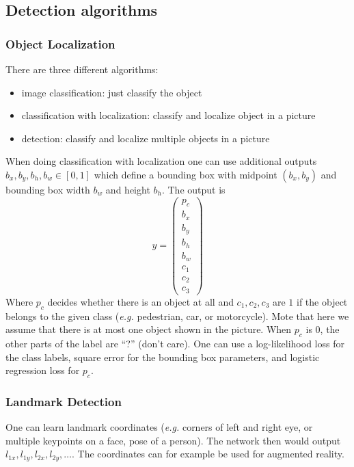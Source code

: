 \documentclass{article}
\begin{document}
\subsection{Detection algorithms}
\subsubsection{Object Localization}\label{cha:localize}
There are three different algorithms:
\begin{itemize}
  \item image classification: just classify the object
  \item classification with localization: classify and localize object in a picture
  \item detection: classify and localize multiple objects in a picture
\end{itemize}
When doing classification with localization one can use additional outputs $b_x, b_y, b_h, b_w\in[0,1]$ which define a bounding box
with midpoint $(b_x,b_y)$ and bounding box width $b_w$ and height $b_h$.
The output is
\begin{equation}
  y=\begin{pmatrix}p_c\\b_x\\b_y\\b_h\\b_w\\c_1\\c_2\\c_3\end{pmatrix}
\end{equation}
Where $p_c$ decides whether there is an object at all and $c_1,c_2,c_3$ are $1$ if the object belongs to the given class (\emph{e.g.} pedestrian, car, or motorcycle).
Mote that here we assume that there is at most one object shown in the picture.
When $p_c$ is $0$, the other parts of the label are ``?'' (don't care).
One can use a log-likelihood loss for the class labels, square error for the bounding box parameters,
and logistic regression loss for $p_c$.

\subsubsection{Landmark Detection}
One can learn landmark coordinates (\emph{e.g.} corners of left and right eye, or multiple keypoints on a face, pose of a person).
The network then would output $l_{1x},l_{1y},l_{2x},l_{2y},\ldots$.
The coordinates can for example be used for augmented reality.
\end{document}
